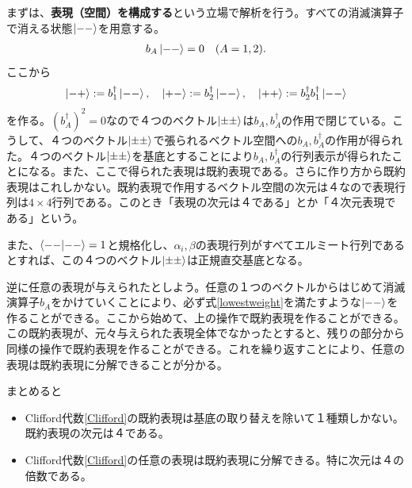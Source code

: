\documentclass[report,paper=a4, fontsize=12pt, line_length=16cm, number_of_lines=33,dvipdfmx]{jlreq}
\numberwithin{equation}{chapter}
\newcommand{\strong}[1]{{\sffamily \bfseries #1}}
\begin{document}
まずは、\strong{表現（空間）を構成する}という立場で解析を行う。すべての消滅演算子で消える状態$\ket{--}$を用意する。
\begin{align}
  b_A\ket{--}=0\quad (A=1,2).
\end{align}
ここから
\begin{align}
  \ket{-+}:=b_{1}^{\dag}\ket{--},\quad 
  \ket{+-}:=b_{2}^{\dag}\ket{--},\quad 
  \ket{++}:=b_{2}^{\dag}b_{1}^{\dag}\ket{--}
\end{align}
を作る。$(b_A^{\dag})^2=0$なので４つのベクトル$\ket{\pm\pm}$は$b_A,b_A^{\dag}$の作用で閉じている。こうして、４つのベクトル$\ket{\pm\pm}$で張られるベクトル空間への$b_A,b_A^{\dag}$の作用が得られた。４つのベクトル$\ket{\pm\pm}$を基底とすることにより$b_A,b_A^{\dag}$の行列表示が得られたことになる。また、ここで得られた表現は既約表現である。さらに作り方から既約表現はこれしかない。既約表現で作用するベクトル空間の次元は４なので表現行列は$4\times 4$行列である。このとき「表現の次元は４である」とか「４次元表現である」という。

また、$\braket{--}{--}=1$と規格化し、$\alpha_i,\beta$の表現行列がすべてエルミート行列であるとすれば、この４つのベクトル$\ket{\pm\pm}$は正規直交基底となる。

逆に任意の表現が与えられたとしよう。任意の１つのベクトルからはじめて消滅演算子$b_A$をかけていくことにより、必ず式\eqref{lowestweight}を満たすような$\ket{--}$を作ることができる。ここから始めて、上の操作で既約表現を作ることができる。この既約表現が、元々与えられた表現全体でなかったとすると、残りの部分から同様の操作で既約表現を作ることができる。これを繰り返すことにより、任意の表現は既約表現に分解できることが分かる。

まとめると
\begin{itemize}
  \item Clifford代数\eqref{Clifford}の既約表現は基底の取り替えを除いて１種類しかない。既約表現の次元は４である。
  \item Clifford代数\eqref{Clifford}の任意の表現は既約表現に分解できる。特に次元は４の倍数である。
\end{itemize}



\end{document}
